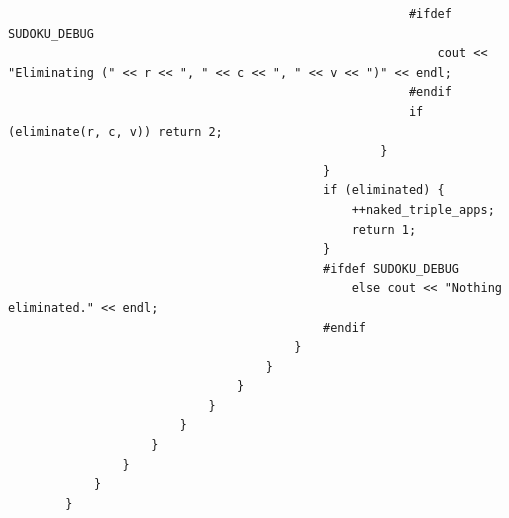 \documentclass{article}
\begin{document}
\begin{lstlisting}
                                                        #ifdef SUDOKU_DEBUG
                                                            cout << "Eliminating (" << r << ", " << c << ", " << v << ")" << endl;
                                                        #endif
                                                        if (eliminate(r, c, v)) return 2;
                                                    }
                                            }
                                            if (eliminated) {
                                                ++naked_triple_apps;
                                                return 1;
                                            }
                                            #ifdef SUDOKU_DEBUG
                                                else cout << "Nothing eliminated." << endl;
                                            #endif
                                        }
                                    }
                                }
                            }
                        }
                    }
                }
            }
        }


\end{lstlisting}
\end{document}
